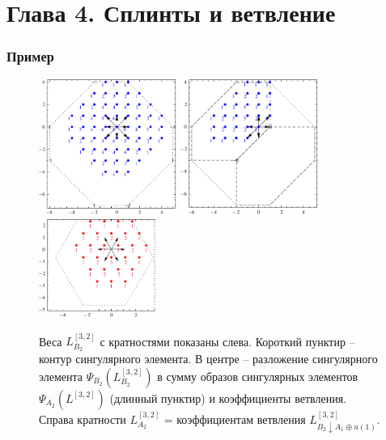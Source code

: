 \documentclass[pdftex]{beamer}
\theoremstyle{definition} \newtheorem{Def}{Определение}
\begin{document}
\section{Глава 4. Сплинты и ветвление}
\begin{frame}
  \frametitle{Пример}
  \vspace{-0.5cm}
\hspace{-0.6cm}
\begin{figure}[h!bt]
  \hspace{-0.8cm}
   \includegraphics[width=45mm]{figures/B2-module-roots}
   \includegraphics[width=45mm]{figures/B2-splint-A2-roots}
   \includegraphics[width=38mm]{figures/A2-module-roots}\\
  \caption{Веса  $L^{[3,2]}_{B_{2}}$  с кратностями показаны слева. Короткий пунктир -- контур сингулярного элемента. В центре -- разложение сингулярного элемента $\Psi_{B_{2}}(L^{[3,2]}_{B_{2}})$ в сумму образов сингулярных элементов $\Psi_{A_{2}}(L^{[3,2]})$ (длинный пунктир) и коэффициенты ветвления. Справа кратности $L^{[3,2]}_{A_{2}}$ =  коэффициентам ветвления $L^{[3,2]}_{B_{2}\downarrow A_{1}\oplus u(1)}$.}

 \label{fig:b2_splint}
\end{figure}

\end{frame}
\end{document}
